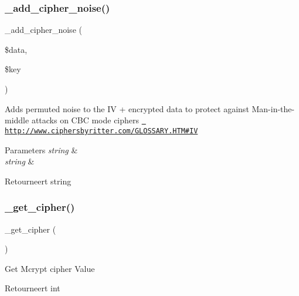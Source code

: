 \subsubsection{\texorpdfstring{\_add\_cipher\_noise()}{\_add\_cipher\_noise()}}
{\footnotesize\ttfamily \+\_\+add\+\_\+cipher\+\_\+noise (\begin{DoxyParamCaption}\item[{}]{\$data,  }\item[{}]{\$key }\end{DoxyParamCaption})\hspace{0.3cm}{\ttfamily [protected]}}

Adds permuted noise to the IV + encrypted data to protect against Man-\/in-\/the-\/middle attacks on C\+BC mode ciphers \href{http://www.ciphersbyritter.com/GLOSSARY.HTM\#IV}{\texttt{ http\+://www.\+ciphersbyritter.\+com/\+G\+L\+O\+S\+S\+A\+R\+Y.\+H\+T\+M\#\+IV}}


\begin{DoxyParams}{Parameters}
{\em string} & \\
\hline
{\em string} & \\
\hline
\end{DoxyParams}
\begin{DoxyReturn}{Retourneert}
string 
\end{DoxyReturn}
\mbox{\label{class_c_i___encrypt_a663ee049f0b7596a0e4925a3eb2db062}} 
\subsubsection{\texorpdfstring{\_get\_cipher()}{\_get\_cipher()}}
{\footnotesize\ttfamily \+\_\+get\+\_\+cipher (\begin{DoxyParamCaption}{ }\end{DoxyParamCaption})\hspace{0.3cm}{\ttfamily [protected]}}

Get Mcrypt cipher Value

\begin{DoxyReturn}{Retourneert}
int 
\end{DoxyReturn}
\mbox{\label{class_c_i___encrypt_a8c6526d9458754249ee7268ead883a6c}} 
